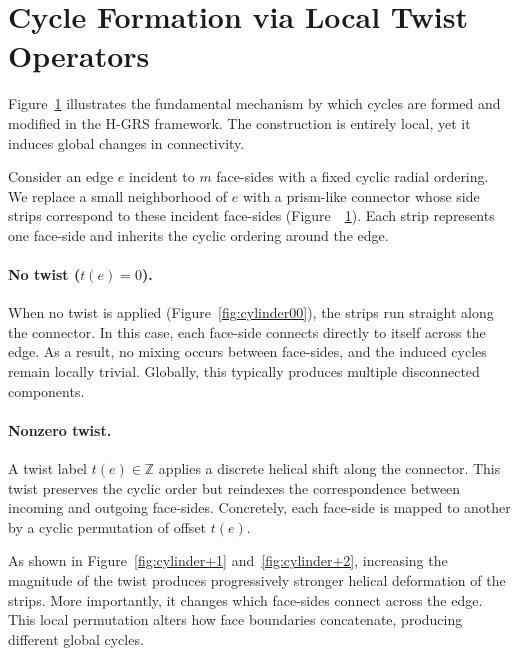 \documentclass[acmtog,nonacm]{acmart}
\begin{document}
\begin{figure}[htb!]
{}   
    \label{fig:supp_chirality}
\end{figure}



\section{Cycle Formation via Local Twist Operators}

Figure~\ref{fig:supp_chirality} illustrates the fundamental mechanism by which cycles are formed and modified in the H-GRS framework. The construction is entirely local, yet it induces global changes in connectivity.

Consider an edge $e$ incident to $m$ face-sides with a fixed cyclic radial ordering. We replace a small neighborhood of $e$ with a prism-like connector whose side strips correspond to these incident face-sides (Figure~~\ref{fig:supp_chirality}). Each strip represents one face-side and inherits the cyclic ordering around the edge.

\paragraph{No twist ($t(e)=0$).}
When no twist is applied (Figure~\ref{fig:cylinder00}), the strips run straight along the connector. In this case, each face-side connects directly to itself across the edge. As a result, no mixing occurs between face-sides, and the induced cycles remain locally trivial. Globally, this typically produces multiple disconnected components.

\paragraph{Nonzero twist.}
A twist label $t(e)\in\mathbb{Z}$ applies a discrete helical shift along the connector. This twist preserves the cyclic order but reindexes the correspondence between incoming and outgoing face-sides. Concretely, each face-side is mapped to another by a cyclic permutation of offset $t(e)$.

As shown in Figure~\ref{fig:cylinder+1} and~\ref{fig:cylinder+2}, increasing the magnitude of the twist produces progressively stronger helical deformation of the strips. More importantly, it changes which face-sides connect across the edge. This local permutation alters how face boundaries concatenate, producing different global cycles.
\end{document}
